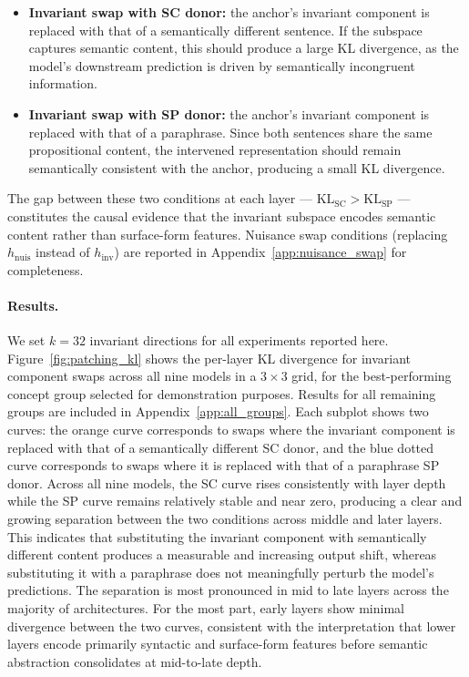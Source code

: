 \begin{itemize}
    \item \textbf{Invariant swap with SC donor:} the anchor's invariant component is replaced with that of a semantically different sentence. If the subspace captures semantic content, this should produce a large KL divergence, as the model's downstream prediction is driven by semantically incongruent information.
    \item \textbf{Invariant swap with SP donor:} the anchor's invariant component is replaced with that of a paraphrase. Since both sentences share the same propositional content, the intervened representation should remain semantically consistent with the anchor, producing a small KL divergence.
\end{itemize}

The gap between these two conditions at each layer — $\mathrm{KL}_{\mathrm{SC}} > \mathrm{KL}_{\mathrm{SP}}$ — constitutes the causal evidence that the invariant subspace encodes semantic content rather than surface-form features. Nuisance swap conditions (replacing $h_{\mathrm{nuis}}$ instead of $h_{\mathrm{inv}}$) are reported in Appendix~\ref{app:nuisance_swap} for completeness.

\vspace{-0.8em}
\paragraph{Results.}
We set $k = 32$ invariant directions for all experiments reported here. Figure~\ref{fig:patching_kl} shows the per-layer KL divergence for invariant component swaps across all nine models in a $3 \times 3$ grid, for the best-performing concept group selected for demonstration purposes. Results for all remaining groups are included in Appendix~\ref{app:all_groups}. Each subplot shows two curves: the orange curve corresponds to swaps where the invariant component is replaced with that of a semantically different SC donor, and the blue dotted curve corresponds to swaps where it is replaced with that of a paraphrase SP donor. Across all nine models, the SC curve rises consistently with layer depth while the SP curve remains relatively stable and near zero, producing a clear and growing separation between the two conditions across middle and later layers. This indicates that substituting the invariant component with semantically different content produces a measurable and increasing output shift, whereas substituting it with a paraphrase does not meaningfully perturb the model's predictions. The separation is most pronounced in mid to late layers across the majority of architectures. For the most part, early layers show minimal divergence between the two curves, consistent with the interpretation that lower layers encode primarily syntactic and surface-form features before semantic abstraction consolidates at mid-to-late depth.

